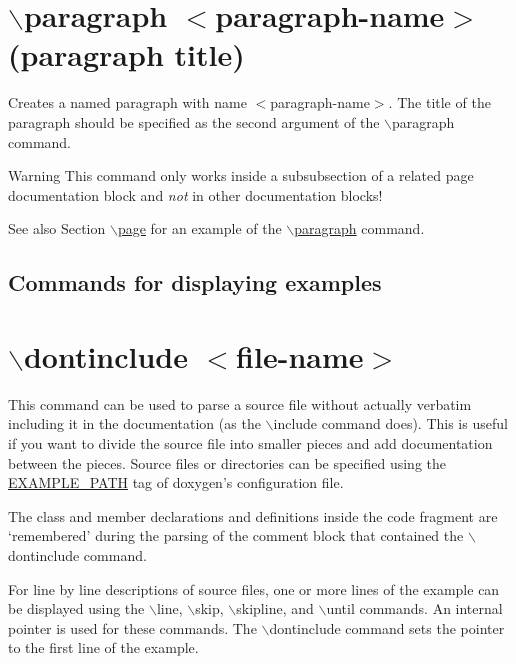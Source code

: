  \hypertarget{commands_cmdparagraph}{}\section{$\backslash$paragraph $<$paragraph-\/name$>$ (paragraph title)}\label{commands_cmdparagraph}
 Creates a named paragraph with name $<$paragraph-\/name$>$. The title of the paragraph should be specified as the second argument of the $\backslash$paragraph command.

\begin{DoxyWarning}{Warning}
This command only works inside a subsubsection of a related page documentation block and {\itshape not\/} in other documentation blocks!
\end{DoxyWarning}
\begin{DoxySeeAlso}{See also}
Section \hyperlink{commands_cmdpage}{$\backslash$page} for an example of the \hyperlink{commands_cmdparagraph}{$\backslash$paragraph} command.
\end{DoxySeeAlso}




 \subsection*{ Commands for displaying examples  }

\hypertarget{commands_cmddontinclude}{}\section{$\backslash$dontinclude $<$file-\/name$>$}\label{commands_cmddontinclude}
 This command can be used to parse a source file without actually verbatim including it in the documentation (as the $\backslash$include command does). This is useful if you want to divide the source file into smaller pieces and add documentation between the pieces. Source files or directories can be specified using the \hyperlink{config_cfg_example_path}{EXAMPLE\_\-PATH} tag of doxygen's configuration file.

The class and member declarations and definitions inside the code fragment are `remembered' during the parsing of the comment block that contained the $\backslash$dontinclude command.

For line by line descriptions of source files, one or more lines of the example can be displayed using the $\backslash$line, $\backslash$skip, $\backslash$skipline, and $\backslash$until commands. An internal pointer is used for these commands. The $\backslash$dontinclude command sets the pointer to the first line of the example.

